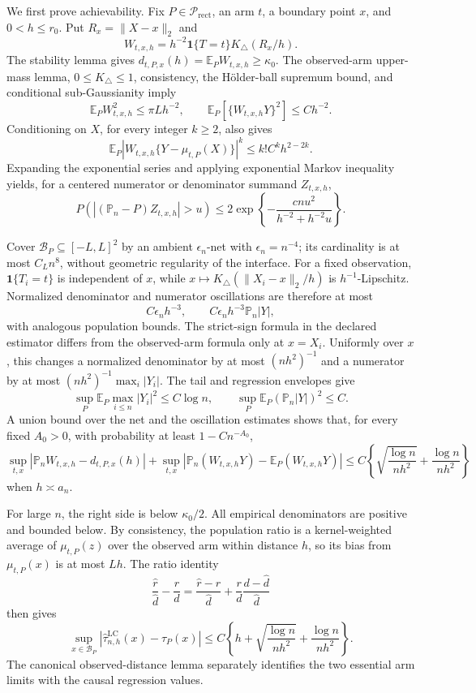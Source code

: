 We first prove achievability.  Fix \(P\in\mathcal P_{\mathrm{rect}}\), an arm \(t\), a boundary point \(x\), and \(0<h\leq r_0\).  Put \(R_x=\lVert X-x\rVert_2\) and
\[
 W_{t,x,h}=h^{-2}\mathbf1\{T=t\}K_\triangle(R_x/h).
\]
The stability lemma gives \(d_{t,P,x}(h)=\mathbb E_PW_{t,x,h}\geq\kappa_0\).  The observed-arm upper-mass lemma, \(0\leq K_\triangle\leq1\), consistency, the H\"older-ball supremum bound, and conditional sub-Gaussianity imply
\[
 \mathbb E_PW_{t,x,h}^2\leq\pi Lh^{-2},
 \qquad
 \mathbb E_P[\{W_{t,x,h}Y\}^2]\leq Ch^{-2}.
\]
Conditioning on \(X\), for every integer \(k\geq2\), also gives
\[
 \mathbb E_P|W_{t,x,h}\{Y-\mu_{t,P}(X)\}|^k
 \leq k!C^kh^{2-2k}.
\]
Expanding the exponential series and applying exponential Markov inequality yields, for a centered numerator or denominator summand \(Z_{t,x,h}\),
\[
 P\!\left(\left|(\mathbb P_n-P)Z_{t,x,h}\right|>u\right)
 \leq2\exp\!\left\{-\frac{cnu^2}{h^{-2}+h^{-2}u}\right\}.
\]

Cover \(\mathcal B_P\subseteq[-L,L]^2\) by an ambient \(\epsilon_n\)-net with \(\epsilon_n=n^{-4}\); its cardinality is at most \(C_Ln^8\), without geometric regularity of the interface.  For a fixed observation, \(\mathbf1\{T_i=t\}\) is independent of \(x\), while \(x\mapsto K_\triangle(\lVert X_i-x\rVert_2/h)\) is \(h^{-1}\)-Lipschitz.  Normalized denominator and numerator oscillations are therefore at most
\[
 C\epsilon_nh^{-3},
 \qquad C\epsilon_nh^{-3}\mathbb P_n|Y|,
\]
with analogous population bounds.  The strict-sign formula in the declared estimator differs from the observed-arm formula only at \(x=X_i\).  Uniformly over \(x\), this changes a normalized denominator by at most \((nh^2)^{-1}\) and a numerator by at most \((nh^2)^{-1}\max_i|Y_i|\).  The tail and regression envelopes give
\[
 \sup_P\mathbb E_P\max_{i\leq n}|Y_i|^2\leq C\log n,
 \qquad
 \sup_P\mathbb E_P(\mathbb P_n|Y|)^2\leq C.
\]
A union bound over the net and the oscillation estimates shows that, for every fixed \(A_0>0\), with probability at least \(1-Cn^{-A_0}\),
\[
 \sup_{t,x}|\mathbb P_nW_{t,x,h}-d_{t,P,x}(h)|
 +\sup_{t,x}|\mathbb P_n(W_{t,x,h}Y)-\mathbb E_P(W_{t,x,h}Y)|
 \leq C\left\{\sqrt{\frac{\log n}{nh^2}}+\frac{\log n}{nh^2}\right\}
\]
when \(h\asymp a_n\).

For large \(n\), the right side is below \(\kappa_0/2\).  All empirical denominators are positive and bounded below.  By consistency, the population ratio is a kernel-weighted average of \(\mu_{t,P}(z)\) over the observed arm within distance \(h\), so its bias from \(\mu_{t,P}(x)\) is at most \(Lh\).  The ratio identity
\[
 \frac{\widehat r}{\widehat d}-\frac rd
 =\frac{\widehat r-r}{\widehat d}
 +\frac rd\frac{d-\widehat d}{\widehat d}
\]
then gives
\[
 \sup_{x\in\mathcal B_P}
 |\widehat\tau^{\mathrm{LC}}_{n,h}(x)-\tau_P(x)|
 \leq C\left\{h+\sqrt{\frac{\log n}{nh^2}}+\frac{\log n}{nh^2}\right\}.
\]
The canonical observed-distance lemma separately identifies the two essential arm limits with the causal regression values.

